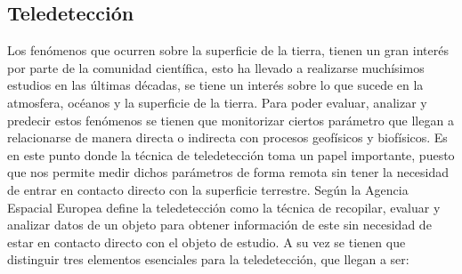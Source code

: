	
	
	
	
	\subsection{Teledetección}
	Los fenómenos que ocurren sobre la superficie de la tierra, tienen un gran interés por parte de la comunidad científica, esto ha llevado a realizarse muchísimos estudios en las últimas décadas, se tiene un interés sobre lo que sucede en la atmosfera, océanos y la superficie de la tierra. Para poder evaluar, analizar y predecir estos fenómenos se tienen que monitorizar ciertos parámetro que llegan a relacionarse de manera directa o indirecta con procesos geofísicos y biofísicos. Es en este punto donde la técnica de teledetección toma un papel importante, puesto que nos permite medir dichos parámetros de forma remota sin tener la necesidad de entrar en contacto directo con la superficie terrestre. 
	Según la Agencia Espacial Europea \parencite{sobrino2001teledeteccion} define la teledetección como la técnica de recopilar, evaluar y analizar datos de un objeto para obtener información de este sin necesidad de estar en contacto directo con el objeto de estudio. A su vez se tienen que distinguir tres elementos esenciales para la teledetección, que llegan a ser:
	
